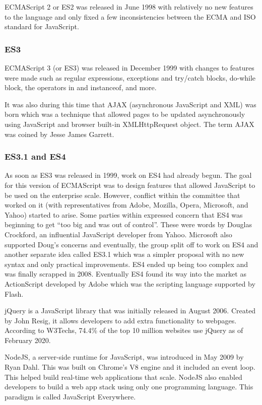 \documentclass{article}
\begin{document}
  ECMAScript 2 or ES2 was released in June 1998 with relatively no new features
  to the language and only fixed a few inconsistencies between the ECMA and ISO
  standard for JavaScript.

  \subsubsection{ES3}
  ECMAScript 3 (or ES3) was released in December 1999 with changes to features
  were made such as regular expressions, exceptions and try/catch blocks,
  do-while block, the operators in and instanceof, and more.

  It was also during this time that AJAX (asynchronous JavaScript and XML) was
  born which was a technique that allowed pages to be updated asynchronously
  using JavaScript and browser built-in XMLHttpRequest object. The term AJAX was
  coined by Jesse James Garrett.

  \subsubsection{ES3.1 and ES4}
  As soon as ES3 was released in 1999, work on ES4 had already begun. The goal
  for this version of ECMAScript was to design features that allowed JavaScript
  to be used on the enterprise scale. However, conflict within the committee
  that worked on it (with representatives from Adobe, Mozilla, Opera, Microsoft,
  and Yahoo) started to arise. Some parties within expressed concern that ES4
  was beginning to get “too big and was out of control”. These were words by
  Douglas Crockford, an influential JavaScript developer from Yahoo. Microsoft
  also supported Doug’s concerns and eventually, the group split off to work on
  ES4 and another separate idea called ES3.1 which was a simpler proposal with
  no new syntax and only practical improvements. ES4 ended up being too complex
  and was finally scrapped in 2008. Eventually ES4 found its way into the market
  as ActionScript developed by Adobe which was the scripting language supported
  by Flash.

  jQuery is a JavaScript library that was initially released in August 2006.
  Created by John Resig, it allows developers to add extra functionality to
  webpages. According to W3Techs, 74.4\% of the top 10 million websites use
  jQuery as of February 2020.

  NodeJS, a server-side runtime for JavaScript, was introduced in May 2009 by
  Ryan Dahl. This was built on Chrome’s V8 engine and it included an event loop.
  This helped build real-time web applications that scale. NodeJS also enabled
  developers to build a web app stack using only one programming language. This
  paradigm is called JavaScript Everywhere.
\end{document}
